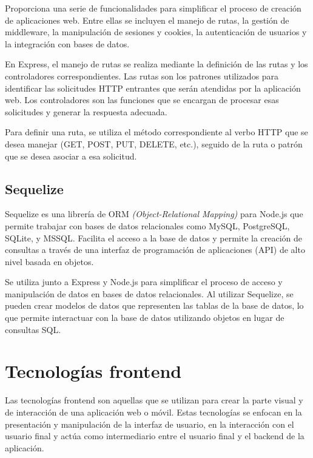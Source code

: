 Proporciona una serie de funcionalidades para simplificar el proceso de creación de aplicaciones web. Entre ellas se incluyen el manejo de rutas, la gestión de middleware, la manipulación de sesiones y cookies, la autenticación de usuarios y la integración con bases de datos.

En Express, el manejo de rutas se realiza mediante la definición de las rutas y los controladores correspondientes. Las rutas son los patrones utilizados para identificar las solicitudes HTTP entrantes que serán atendidas por la aplicación web. Los controladores son las funciones que se encargan de procesar esas solicitudes y generar la respuesta adecuada.

Para definir una ruta, se utiliza el método correspondiente al verbo HTTP que se desea manejar (GET, POST, PUT, DELETE, etc.), seguido de la ruta o patrón que se desea asociar a esa solicitud. 

\subsection{Sequelize}
\label{subsec:sequelize}

Sequelize es una librería de ORM \textit{(Object-Relational Mapping)} para Node.js que permite trabajar con bases de datos relacionales como MySQL, PostgreSQL, SQLite, y MSSQL. Facilita el acceso a la base de datos y permite la creación de consultas a través de una interfaz de programación de aplicaciones (API) de alto nivel basada en objetos.

Se utiliza junto a Express y Node.js para simplificar el proceso de acceso y manipulación de datos en bases de datos relacionales. Al utilizar Sequelize, se pueden crear modelos de datos que representen las tablas de la base de datos, lo que permite interactuar con la base de datos utilizando objetos en lugar de consultas SQL.

\section{Tecnologías frontend}
\label{sec:frontend}

Las tecnologías frontend son aquellas que se utilizan para crear la parte visual y de interacción de una aplicación web o móvil. Estas tecnologías se enfocan en la presentación y manipulación de la interfaz de usuario, en la interacción con el usuario final y actúa como intermediario entre el usuario final y el backend de la aplicación.

